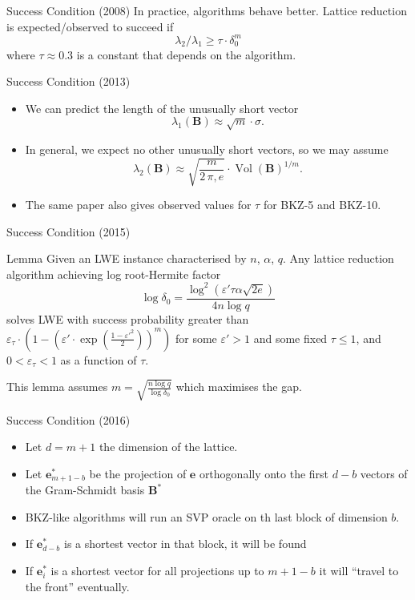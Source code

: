 \documentclass[presentation,smaller]{beamer}
\renewcommand{\vec}[1]{\mathbf{#1}\xspace}
\newcommand{\mat}[1]{\mathbf{#1}\xspace}
\DeclareMathOperator{\Vol}{Vol}
\begin{document}
\begin{frame}[label={sec:org3e01dbb}]{Success Condition (2008)}
In practice, algorithms behave better. Lattice reduction is expected/observed  to succeed if \[λ_2/λ_1 ≥ τ ⋅ δ_0^m\] where \(τ ≈ 0.3\) is a constant that depends on the algorithm.
\end{frame}

\begin{frame}[label={sec:org338a36b}]{Success Condition (2013)}
\begin{itemize}
\item We can predict the length of the unusually short vector \[λ_1(\vec{B}) ≈ \sqrt{m} ⋅ σ.\]

\item In general, we expect no other unusually short vectors, so we may assume  \[λ_2(\vec{B}) ≈ \sqrt{\frac{m}{2\,π,e}} ⋅ \Vol(\vec{B})^{1/m}.\]

\item The same paper also gives observed values for \(τ\) for BKZ-5 and BKZ-10.
\end{itemize}
\end{frame}

\begin{frame}[label={sec:org87b3ae9}]{Success Condition (2015)}
\begin{block}{Lemma }
Given an LWE instance characterised by \(n\), \(α\), \(q\). Any lattice reduction algorithm achieving log root-Hermite factor \[\log{δ_0} = \frac{\log^2{\left(ε' τ α \sqrt{2e}\right)}}{4 n \log{q}}\] solves LWE with success probability greater than \(ε_τ ⋅ \left( 1-\left(ε' ⋅  \exp{\left(\frac{1-ε'^2}{2}\right)}\right)^m \right)\) for some \(ε' > 1\) and some fixed \(τ ≤ 1\), and \(0 < ε_τ < 1\) as a function of \(τ\).
\end{block}

This lemma assumes \(m = \sqrt{\frac{n \log q}{\log δ_0}}\) which maximises the gap.
\end{frame}

\begin{frame}[label={sec:org8bb51fd}]{Success Condition (2016)}
\begin{itemize}
\item Let \(d = m+1\) the dimension of the lattice.
\item Let \(\vec{e}^*_{m+1-b}\) be the projection of \(\vec{e}\) orthogonally onto the first \(d-b\) vectors of the Gram-Schmidt basis \(\mat{B}^*\)
\item BKZ-like algorithms will run an SVP oracle on th last block of dimension \(b\).
\item If \(\vec{e}^*_{d-b}\) is a shortest vector in that block, it will be found
\item If \(\vec{e}^*_i\) is a shortest vector for all projections up to \(m+1-b\) it will “travel to the front” eventually.
\end{itemize}
\end{frame}
\end{document}
